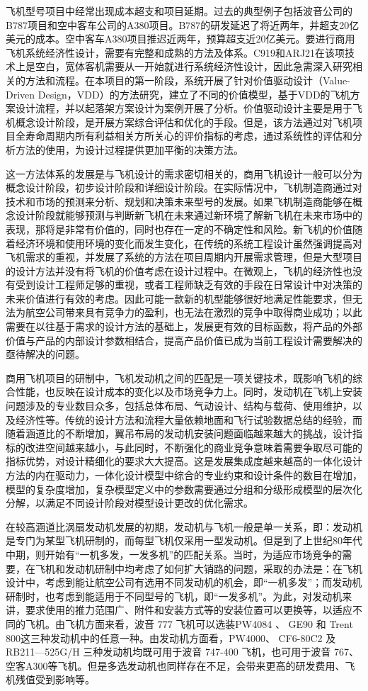 \documentclass[12pt,a4paper]{report}
\begin{document}
飞机型号项目中经常出现成本超支和项目延期。过去的典型例子包括波音公司的B787项目和空中客车公司的A380项目。B787的研发延迟了将近两年，并超支20亿美元的成本。空中客车A380项目推迟近两年，预算超支近20亿美元。要进行商用飞机系统经济性设计，需要有完整和成熟的方法及体系。C919和ARJ21在该项技术上是空白，宽体客机需要从一开始就进行系统经济性设计，因此急需深入研究相关的方法和流程。在本项目的第一阶段，系统开展了针对价值驱动设计（Value-Driven Design，VDD）的方法研究，建立了不同的价值模型，基于VDD的飞机方案设计流程，并以起落架方案设计为案例开展了分析。价值驱动设计主要是用于飞机概念设计阶段，是开展方案综合评估和优化的手段。但是，该方法通过对飞机项目全寿命周期内所有利益相关方所关心的评价指标的考虑，通过系统性的评估和分析方法的使用，为设计过程提供更加平衡的决策方法。

这一方法体系的发展是与飞机设计的需求密切相关的，商用飞机设计一般可以分为概念设计阶段，初步设计阶段和详细设计阶段。在实际情况中，飞机制造商通过对技术和市场的预测来分析、规划和决策未来型号的发展。如果飞机制造商能够在概念设计阶段就能够预测与判断新飞机在未来通过新环境了解新飞机在未来市场中的表现，那将是非常有价值的，同时也存在一定的不确定性和风险。新飞机的价值随着经济环境和使用环境的变化而发生变化，在传统的系统工程设计虽然强调提高对飞机需求的重视，并发展了系统的方法在项目周期内开展需求管理，但是大型项目的设计方法并没有将飞机的价值考虑在设计过程中。在微观上，飞机的经济性也没有受到设计工程师足够的重视，或者工程师缺乏有效的手段在日常设计中对决策的未来价值进行有效的考虑。因此可能一款新的机型能够很好地满足性能要求，但无法为航空公司带来具有竞争力的盈利，也无法在激烈的竞争中取得商业成功；以此需要在以往基于需求的设计方法的基础上，发展更有效的目标函数，将产品的外部价值与产品的内部设计参数相结合，提高产品价值已成为当前工程设计需要解决的亟待解决的问题。

商用飞机项目的研制中，飞机发动机之间的匹配是一项关键技术，既影响飞机的综合性能，也反映在设计成本的变化以及市场竞争力上。同时，发动机在飞机上安装问题涉及的专业数目众多，包括总体布局、气动设计、结构与载荷、使用维护，以及经济性等。传统的设计方法和流程大量依赖地面和飞行试验数据总结的经验，而随着涵道比的不断增加，翼吊布局的发动机安装问题面临越来越大的挑战，设计指标的改进空间越来越小，与此同时，不断强化的商业竞争意味着需要争取尽可能的指标优势，对设计精细化的要求大大提高。这是发展集成度越来越高的一体化设计方法的内在驱动力，一体化设计模型中综合的专业约束和设计条件的数目在增加，模型的复杂度增加，复杂模型定义中的参数需要通过分组和分级形成模型的层次化分解，以满足不同设计阶段对模型设计更改的优化需求。

在较高涵道比涡扇发动机发展的初期，发动机与飞机一般是单一关系，即：发动机是专门为某型飞机研制的，而每型飞机仅采用一型发动机。但是到了上世纪80年代中期，则开始有“一机多发，一发多机”的匹配关系。当时，为适应市场竞争的需要，在飞机和发动机研制中均考虑了如何扩大销路的问题，采取的办法是：在飞机设计中，考虑到能让航空公司有选用不同发动机的机会，即“一机多发”；而发动机研制时，也考虑到能适用于不同型号的飞机，即“一发多机”。为此，对发动机来讲，要求使用的推力范围广、附件和安装方式等的安装位置可以更换等，以适应不同的飞机。由飞机方面来看，波音 777 飞机可以选装PW4084 、 GE90 和 Trent 800这三种发动机中的任意一种。由发动机方面看，PW4000、 CF6-80C2 及 RB211—525G/H 三种发动机均既可用于波音 747-400 飞机，也可用于波音 767、空客A300等飞机。但是多选发动机也同样存在不足，会带来更高的研发费用、飞机残值受到影响等。
\end{document}
